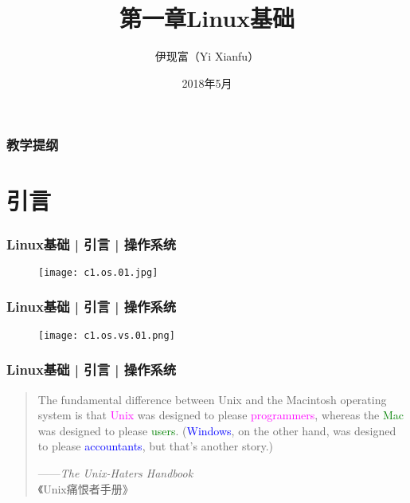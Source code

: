 



\title[Linux基础]{第一章\quad Linux基础}
\author[Yixf]{伊现富（Yi Xianfu）}
\date{2018年5月}

%

\begin{frame}
  \titlepage
\end{frame}

\begin{frame}[plain]
  \frametitle{教学提纲}
  \setcounter{tocdepth}{3}
  \begin{multicols}{2}
    \tableofcontents
  \end{multicols}
\end{frame}

\section{引言}
\begin{frame}
  \frametitle{Linux基础 | 引言 | 操作系统}
  \begin{figure}
    \centering
    \texttt{[image: c1.os.01.jpg]}
  \end{figure}
\end{frame}

\begin{frame}
  \frametitle{Linux基础 | 引言 | 操作系统}
  \begin{figure}
    \centering
    \texttt{[image: c1.os.vs.01.png]}
  \end{figure}
\end{frame}

\begin{frame}
  \frametitle{Linux基础 | 引言 | 操作系统}
  \begin{quotation}
    The fundamental difference between Unix and the Macintosh operating system is that \textcolor{magenta}{Unix} was designed to please \textcolor{magenta}{programmers}, whereas the \textcolor{green}{Mac} was designed to please \textcolor{green}{users}. (\textcolor{blue}{Windows}, on the other hand, was designed to please \textcolor{blue}{accountants}, but that's another story.)
    \begin{flushright}
      ——\textit{The Unix-Haters Handbook}\\《Unix痛恨者手册》
    \end{flushright}
  \end{quotation}
\end{frame}

